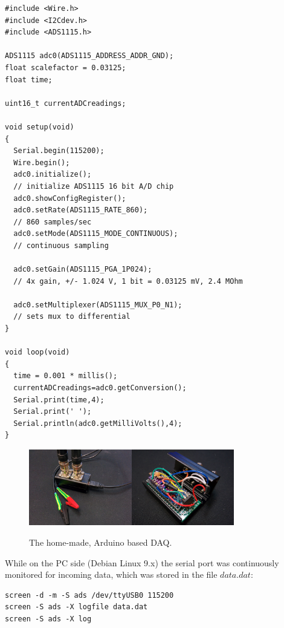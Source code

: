 \begin{lstlisting}
#include <Wire.h>
#include <I2Cdev.h>
#include <ADS1115.h>

ADS1115 adc0(ADS1115_ADDRESS_ADDR_GND); 
float scalefactor = 0.03125;
float time;

uint16_t currentADCreadings;  

void setup(void)
{
  Serial.begin(115200);  
  Wire.begin();
  adc0.initialize();
  // initialize ADS1115 16 bit A/D chip
  adc0.showConfigRegister();
  adc0.setRate(ADS1115_RATE_860);
  // 860 samples/sec
  adc0.setMode(ADS1115_MODE_CONTINUOUS);
  // continuous sampling

  adc0.setGain(ADS1115_PGA_1P024);
  // 4x gain, +/- 1.024 V, 1 bit = 0.03125 mV, 2.4 MOhm
 
  adc0.setMultiplexer(ADS1115_MUX_P0_N1);
  // sets mux to differential
}

void loop(void)
{  
  time = 0.001 * millis();
  currentADCreadings=adc0.getConversion(); 
  Serial.print(time,4);
  Serial.print(' ');
  Serial.println(adc0.getMilliVolts(),4);
} 
\end{lstlisting}


\begin{figure}
\centering
\includegraphics[width=0.4\textwidth]{img/daq1.jpg}\includegraphics[width=0.4\textwidth]{img/daq2.jpg}
\caption[The home-made, Arduino based DAQ.]{The home-made, Arduino based DAQ.}
\label{fig:daq}
\end{figure}

While on the PC side (Debian Linux 9.x) the serial port was continuously monitored for incoming data, which was stored in the file $data.dat$:

\begin{lstlisting}
screen -d -m -S ads /dev/ttyUSB0 115200
screen -S ads -X logfile data.dat
screen -S ads -X log
\end{lstlisting}

